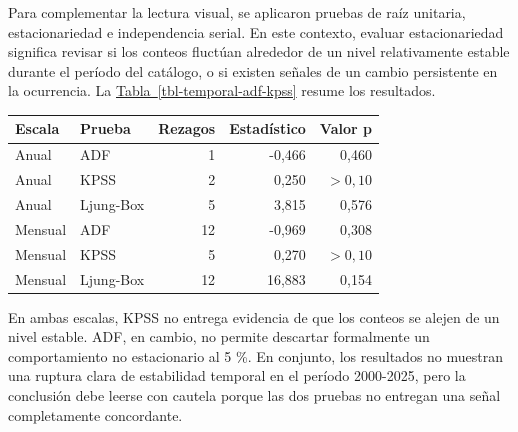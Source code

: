 \documentclass[
  spanish,
  letterpaper,
  DIV=11,
  numbers=noendperiod]{scrartcl}
\begin{document}
\noindent
\begin{minipage}[t]{0.45\textwidth}
\vspace{0pt}
Para complementar la lectura visual, se aplicaron pruebas de raíz unitaria, estacionariedad e independencia serial. En este contexto, evaluar estacionariedad significa revisar si los conteos fluctúan alrededor de un nivel relativamente estable durante el período del catálogo, o si existen señales de un cambio persistente en la ocurrencia. La \hyperref[tbl-temporal-adf-kpss]{Tabla~\ref*{tbl-temporal-adf-kpss}} resume los resultados.
\end{minipage}\hfill
\begin{minipage}[t]{0.51\textwidth}
\vspace{0pt}
\begingroup
\scriptsize
\centering
\setlength{\tabcolsep}{2.2pt}
\renewcommand{\arraystretch}{0.82}
{}
\label{tbl-temporal-adf-kpss}
\hypertarget{dest-tbl-temporal-adf-kpss}{}
\begin{tabular*}{\linewidth}{@{\extracolsep{\fill}}llrrr@{}}
\toprule
Escala & Prueba & Rezagos & Estadístico & Valor p \\
\midrule
Anual & ADF & 1 & -0,466 & 0,460 \\
Anual & KPSS & 2 & 0,250 & $>0{,}10$ \\
Anual & Ljung-Box & 5 & 3,815 & 0,576 \\
Mensual & ADF & 12 & -0,969 & 0,308 \\
Mensual & KPSS & 5 & 0,270 & $>0{,}10$ \\
Mensual & Ljung-Box & 12 & 16,883 & 0,154 \\
\bottomrule
\end{tabular*}
\par\vspace{0.10em}
\endgroup
\end{minipage}
\par\vspace{-0.25em}

En ambas escalas, KPSS no entrega evidencia de que los conteos se alejen
de un nivel estable. ADF, en cambio, no permite descartar formalmente un
comportamiento no estacionario al 5 \%. En conjunto, los resultados no
muestran una ruptura clara de estabilidad temporal en el período
2000-2025, pero la conclusión debe leerse con cautela porque las dos
pruebas no entregan una señal completamente concordante.
\end{document}
